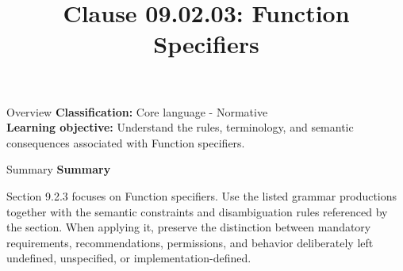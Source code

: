 \documentclass[10pt,letterpaper]{article}
\title{Clause 09.02.03: Function Specifiers}
\author{}
\date{}
\begin{document}
\maketitle
\begin{CornellOverviewBox}{Overview}
\textbf{Classification:} Core language - Normative\\[2pt]
\textbf{Learning objective:} Understand the rules, terminology, and semantic consequences associated with Function specifiers.
\end{CornellOverviewBox}\begin{CornellSummaryBox}{Summary}
{\sffamily\bfseries\color{Accent} Summary}\par\vspace{3pt}Section 9.2.3 focuses on Function specifiers. Use the listed grammar productions together with the semantic constraints and disambiguation rules referenced by the section. When applying it, preserve the distinction between mandatory requirements, recommendations, permissions, and behavior deliberately left undefined, unspecified, or implementation-defined.
\end{CornellSummaryBox}
\end{document}
